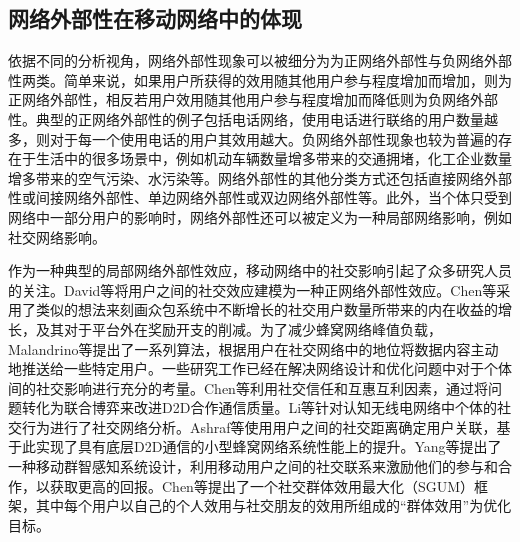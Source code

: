 


\subsection{网络外部性在移动网络中的体现}


依据不同的分析视角，网络外部性现象可以被细分为为正网络外部性与负网络外部性两类。简单来说，如果用户所获得的效用随其他用户参与程度增加而增加，则为正网络外部性，相反若用户效用随其他用户参与程度增加而降低则为负网络外部性。典型的正网络外部性的例子包括电话网络，使用电话进行联络的用户数量越多，则对于每一个使用电话的用户其效用越大。负网络外部性现象\cite{negative}也较为普遍的存在于生活中的很多场景中，例如机动车辆数量增多带来的交通拥堵，化工企业数量增多带来的空气污染、水污染等。网络外部性的其他分类方式还包括直接网络外部性或间接网络外部性、单边网络外部性或双边网络外部性等。此外，当个体只受到网络中一部分用户的影响时，网络外部性还可以被定义为一种{\kaishu 局部网络影响}，例如社交网络影响\cite{jianweibook}。

作为一种典型的局部网络外部性效应，移动网络中的社交影响引起了众多研究人员的关注。David等\cite{David10}将用户之间的社交效应建模为一种正网络外部性效应。Chen等\cite{Baochun}采用了类似的想法来刻画众包系统中不断增长的社交用户数量所带来的内在收益的增长，及其对于平台外在奖励开支的削减。为了减少蜂窝网络峰值负载，Malandrino等\cite{social}提出了一系列算法，根据用户在社交网络中的地位将数据内容主动地推送给一些特定用户。一些研究工作已经在解决网络设计和优化问题中对于个体间的社交影响进行充分的考量。Chen等\cite{Chen13}利用社交信任和互惠互利因素，通过将问题转化为联合博弈来改进D2D合作通信质量。Li等\cite{li2011propagation}针对认知无线电网络中个体的社交行为进行了社交网络分析。Ashraf等\cite{Ashraf}使用用户之间的社交距离确定用户关联，基于此实现了具有底层D2D通信的小型蜂窝网络系统性能上的提升。Yang等\cite{Guang}提出了一种移动群智感知系统设计，利用移动用户之间的社交联系来激励他们的参与和合作，以获取更高的回报。Chen等\cite{Chen14}提出了一个社交群体效用最大化（SGUM）框架，其中每个用户以自己的个人效用与社交朋友的效用所组成的“群体效用”为优化目标。

